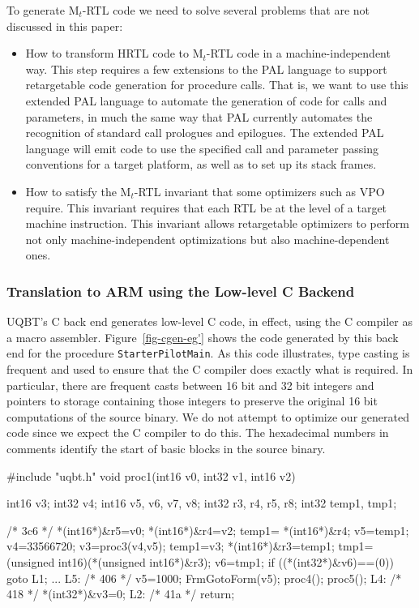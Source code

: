 To generate M$_t$-RTL code we need to solve several 
problems that are not discussed in this paper: 
\begin{itemize}
\item How to transform HRTL code to M$_t$-RTL code in a
      machine-independent way. 
      This step requires a few extensions to the PAL language
      to support retargetable code generation for procedure calls.
      That is, we want to use this extended PAL language to automate
      the generation of code for calls and parameters, in much the same 
      way that PAL currently automates the recognition of standard 
      call prologues and epilogues.
      The extended PAL language will emit code to use the specified
      call and parameter passing conventions for a target platform, 
      as well as to set up its stack frames. 

\item How to satisfy the M$_t$-RTL invariant that some optimizers
      such as VPO require. 
      This invariant requires that each RTL be at the level of 
      a target machine instruction.
      This invariant allows retargetable optimizers to perform
      not only machine-independent optimizations
      but also machine-dependent ones. 
\end{itemize}


\subsubsection{Translation to ARM using the Low-level C Backend}
\label{sec-to-c}
UQBT's C back end generates low-level C code, in effect, using 
the C compiler as a macro assembler.  
Figure~\ref{fig-cgen-eg'} shows the code generated by this back end
for the procedure \texttt{StarterPilotMain}. 
As this code illustrates, type casting is frequent and
used to ensure that the C compiler does exactly what is required.
In particular, there are frequent casts
between 16 bit and 32 bit integers
and pointers to storage containing those integers
to preserve the original 16 bit computations
of the source binary.
We do not attempt to optimize our generated code
since we expect the C compiler to do this.
The hexadecimal numbers in comments
identify the start of basic blocks in the source binary.

\centerfigbegin
\begin{fnverbatim}
#include "uqbt.h"
void proc1(int16 v0, int32 v1, int16 v2) {
    int16 v3;
    int32 v4;
    int16 v5, v6, v7, v8;
    int32 r3, r4, r5, r8;
    int32 temp1, tmp1;

    /* 3c6 */
    *(int16*)&r5=v0;
    *(int16*)&r4=v2;
    temp1= *(int16*)&r4;
    v5=temp1;
    v4=33566720;
    v3=proc3(v4,v5);
    temp1=v3;
    *(int16*)&r3=temp1;
    tmp1=(unsigned int16)(*(unsigned int16*)&r3);
    v6=tmp1;
    if ((*(int32*)&v6)==(0)) goto L1;
    ...
L5:      /* 406 */
    v5=1000;
    FrmGotoForm(v5);
    proc4();
    proc5();
L4:      /* 418 */
    *(int32*)&v3=0;
L2:      /* 41a */
    return;
}
\end{fnverbatim}

